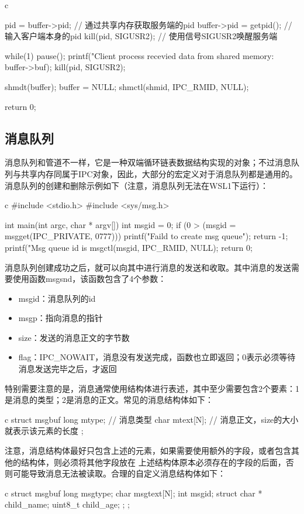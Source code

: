 \begin{code-block}{c}
{        pid = buffer->pid; // 通过共享内存获取服务端的pid
        buffer->pid = getpid(); // 输入客户端本身的pid
        kill(pid, SIGUSR2); // 使用信号SIGUSR2唤醒服务端

        while(1)
        {
                pause();
                printf("Client process recevied data from shared memory: %
                        buffer->buf);
                kill(pid, SIGUSR2);
        }

        shmdt(buffer);
        buffer = NULL;
        shmctl(shmid, IPC_RMID, NULL);

        return 0;
}
\end{code-block}

\subsection{消息队列}
消息队列和管道不一样，它是一种双端循环链表数据结构实现的对象；不过消息队列与共享内存同属于IPC对象，因此，大部分的宏定义对于消息队列都是通用的。
消息队列的创建和删除示例如下（注意，消息队列无法在WSL1下运行）：
\begin{code-block}{c}
#include <stdio.h>
#include <sys/msg.h>

int main(int argc, char * argv[])
{
        int msgid = 0;
        if (0 > (msgid = msgget(IPC_PRIVATE, 0777)))
        {
                printf("Faild to create msg queue\n");
                return -1;
        }
        printf("Msg queue id is %
        msgctl(msgid, IPC_RMID, NULL);
        return 0;
}
\end{code-block}

消息队列创建成功之后，就可以向其中进行消息的发送和收取。其中消息的发送需要使用函数msgsnd，该函数包含了4个参数：
\begin{itemize}
  \item msgid：消息队列的id
  \item msgp：指向消息的指针
  \item size：发送的消息正文的字节数
  \item flag：IPC\_NOWAIT，消息没有发送完成，函数也立即返回；0表示必须等待消息发送完毕之后，才返回
\end{itemize}
特别需要注意的是，消息通常使用结构体进行表述，其中至少需要包含2个要素：1是消息的类型；2是消息的正文。常见的消息结构体如下：
\begin{code-block}{c}
struct msgbuf{
        long mtype; // 消息类型
        char mtext[N]; // 消息正文，size的大小就表示该元素的长度
};
\end{code-block}
注意，消息结构体最好只包含上述的元素，如果需要使用额外的字段，或者包含其他的结构体，则必须将其他字段放在
上述结构体原本必须存在的字段的后面，否则可能导致消息无法被读取。合理的自定义消息结构体如下：
\begin{code-block}{c}
struct msgbuf{
        long msgtype;
        char msgtext[N];
        int msgid;
        struct {
            char * child_name;
            uint8_t child_age;
        };
};
\end{code-block}

